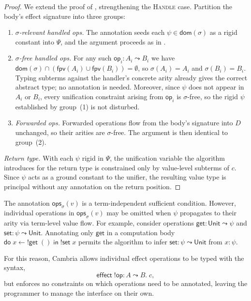 \documentclass{article}
\theoremstyle{definition}
\theoremstyle{remark}
\newcommand{\unit}{\mathsf{Unit}}
\newcommand{\op}{\mathsf{op}}
\newcommand{\ddo}{\mathsf{do}\;}
\newcommand{\iin}{\;\mathsf{in}\;}
\newcommand{\effect}{\mathsf{effect}\;}
\newcommand{\dom}{\mathsf{dom}}
\newcommand{\fpv}{\mathsf{fpv}}
\newcommand{\ops}{\mathsf{ops}}
\begin{document}
\begin{proof}
  We extend the proof of , strengthening the \textsc{Handle} case.
  Partition the body's effect signature into three groups:

  \begin{enumerate}
    \item \emph{$\sigma$-relevant handled ops.}
          The annotation seeds each $\psi \in \dom(\sigma)$ as a rigid constant
          into $\Psi$, and the argument proceeds as in .

    \item \emph{$\sigma$-free handled ops.}
          For any such $\op_i : A_i \leadsto B_i$ we have
          $\dom(\sigma) \cap (\fpv(A_i) \cup \fpv(B_i)) = \emptyset$,
          so $\sigma(A_i) = A_i$ and $\sigma(B_i) = B_i$.
          Typing subterms against the handler's concrete arity already gives the correct
          abstract type; no annotation is needed.
          Moreover, since $\psi$ does not appear in $A_i$ or $B_i$, every unification
          constraint arising from $\op_i$ is $\sigma$-free, so the rigid $\psi$
          established by group~(1) is not disturbed.

    \item \emph{Forwarded ops.}
          Forwarded operations flow from the body's signature into $D$ unchanged, so
          their arities are $\sigma$-free.
          The argument is then identical to group~(2).
  \end{enumerate}
  \emph{Return type.}
  With each $\psi$ rigid in $\Psi$, the unification variable the algorithm introduces
  for the return type is constrained only by value-level subterms of $c$.
  Since $\psi$ acts as a ground constant to the unifier, the resulting value type is
  principal without any annotation on the return position.
\end{proof}

The annotation $\ops_\sigma(v)$ is a term-independent sufficient condition.
However, individual operations in $\ops_\sigma(v)$ may be omitted when
$\psi$ propagates to their arity via term-level value flow.
For example, consider operations $\mathsf{get} : \unit \leadsto \psi$ and
$\mathsf{set} : \psi \leadsto \unit$. Annotating only $\mathsf{get}$ in a computation body
$\ddo x \leftarrow {!}\mathsf{get}\; () \iin {!}\mathsf{set}\;x$ permits the algorithm
to infer $\mathsf{set} : \psi \leadsto \unit$ from $x : \psi$.

For this reason, Cambria allows individual effect operations to be typed with the
syntax,
\[
\effect !\op : A \leadsto B. \; c,
\]
but enforces no constraints on which operations need to be annotated,
leaving the programmer to manage the interface on their own.



\end{document}
